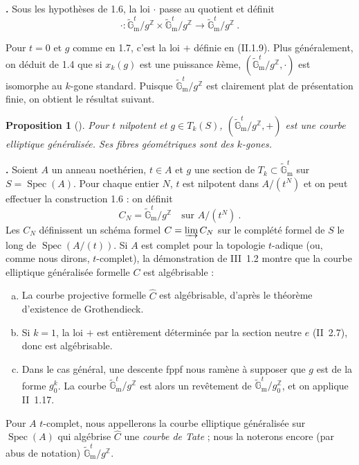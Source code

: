 \documentclass[12pt,a4paper]{amsart}
\theoremstyle{plain}
\newtheorem{proposition}{Proposition}[section]
\theoremstyle{definition}
\theoremstyle{remark}
\DeclareMathOperator{\Spec}{Spec}
\newcommand{\ZZ}{\mathbb{Z}}
\newcommand{\Gmtilde}{\widetilde{\mathbb{G}}_\mathrm{m}}
\begin{document}
\noindent \textbf{\theproposition.} Sous les hypoth\`eses de 1.6, la loi $\cdot$ passe au quotient et d\'efinit
\[
\cdot : \Gmtilde^t / g^{\ZZ} \times \Gmtilde^t / g^{\ZZ} \longrightarrow \Gmtilde^t / g^{\ZZ} \ .
\]

Pour $t = 0$ et $g$ comme en 1.7, c'est la loi $+$ d\'efinie en (II.1.9). Plus g\'en\'eralement, on d\'eduit de 1.4 que si $x_k(g)$ est une puissance $k$\`eme, $(\Gmtilde^t / g^{\ZZ}, \cdot)$ est isomorphe au $k$-gone standard. Puisque $\Gmtilde^t / g^{\ZZ}$ est clairement plat de pr\'esentation finie, on obtient le r\'esultat suivant.

\begin{proposition}[\theproposition]
Pour $t$ nilpotent et $g \in T_k(S)$, $(\Gmtilde^t / g^{\ZZ}, +)$ est une courbe elliptique g\'en\'eralis\'ee. Ses fibres g\'eom\'etriques sont des $k$-gones.
\end{proposition}

\noindent \textbf{\theproposition.} Soient $A$ un anneau noeth\'erien, $t \in A$ et $g$ une section de $T_k \subset \Gmtilde^t$ sur $S = \Spec(A)$. Pour chaque entier $N$, $t$ est nilpotent dans $A/(t^N)$ et on peut effectuer la construction 1.6 : on d\'efinit
\[
C_N = \Gmtilde^t / g^{\ZZ} \quad \text{sur } A/(t^N) \ .
\]
Les $C_N$ d\'efinissent un sch\'ema formel $C = \varinjlim C_N$ sur le compl\'et\'e formel de $S$ le long de $\Spec(A/(t))$. Si $A$ est complet pour la topologie $t$-adique (ou, comme nous dirons, $t$-complet), la d\'emonstration de III~1.2 montre que la courbe elliptique g\'en\'eralis\'ee formelle $C$ est alg\'ebrisable :

\begin{enumerate}[a)]
\item La courbe projective formelle $\widehat{C}$ est alg\'ebrisable, d'apr\`es le th\'eor\`eme d'existence de Grothendieck.

\item Si $k = 1$, la loi $+$ est enti\`erement d\'etermin\'ee par la section neutre $e$ (II~2.7), donc est alg\'ebrisable.

\item Dans le cas g\'en\'eral, une descente fppf nous ram\`ene \`a supposer que $g$ est de la forme $g_0^k$. La courbe $\Gmtilde^t / g^{\ZZ}$ est alors un rev\^etement de $\Gmtilde^t / g_0^{\ZZ}$, et on applique II~1.17.
\end{enumerate}

Pour $A$ $t$-complet, nous appellerons la courbe elliptique g\'en\'eralis\'ee sur $\Spec(A)$ qui alg\'ebrise $\widehat{C}$ une \emph{courbe de Tate} ; nous la noterons encore (par abus de notation) $\Gmtilde^t / g^{\ZZ}$.
\end{document}
